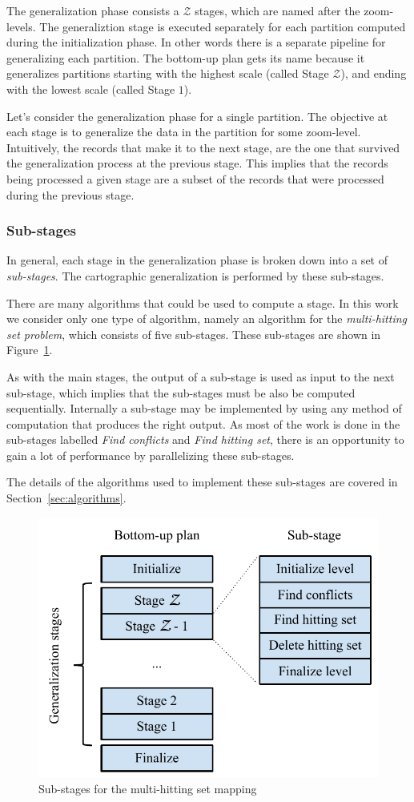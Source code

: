 The generalization phase consists a $\mathcal{Z}$ stages, which are named after the zoom-levels. The generaliztion stage is executed separately for each partition computed during the initialization phase. In other words there is a separate pipeline for generalizing each partition. The bottom-up plan gets its name because it generalizes partitions starting with the highest scale (called Stage $\mathcal{Z}$), and ending with the lowest scale (called Stage $1$).

Let's consider the generalization phase for a single partition. The objective at each stage is to generalize the data in the partition for some zoom-level. Intuitively, the records that make it to the next stage, are the one that survived the generalization process at the previous stage. This implies that the records being processed a given stage are a subset of the records that were processed during the previous stage.

\subsubsection{Sub-stages}
In general, each stage in the generalization phase is broken down into a set of \emph{sub-stages}. The cartographic generalization is performed by these sub-stages. 

There are many algorithms that could be used to compute a stage. In this work we consider only one type of algorithm, namely an algorithm for the \emph{multi-hitting set problem}, which consists of five sub-stages. These sub-stages are shown in Figure~\ref{fig:stages}. 

As with the main stages, the output of a sub-stage is used as input to the next sub-stage, which implies that the sub-stages must be also be computed sequentially. Internally a sub-stage may be implemented by using any method of computation that produces the right output. As most of the work is done in the sub-stages labelled \emph{Find conflicts} and \emph{Find hitting set}, there is an opportunity to gain a lot of performance by parallelizing these sub-stages.

The details of the algorithms used to implement these sub-stages are covered in Section~\ref{sec:algorithms}. 

\begin{figure}[htbp]
\begin{center}
\includegraphics[scale=.7]{figs/cvl_stages.pdf}
\caption{Sub-stages for the multi-hitting set mapping}
\label{fig:stages}
\end{center}
\end{figure}
